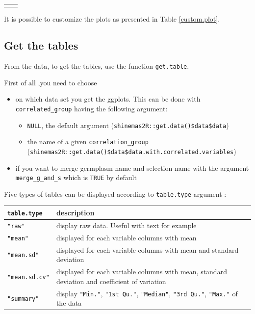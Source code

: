 \documentclass{article}\usepackage[]{graphicx}\usepackage[]{color}
\newenvironment{knitrout}{}{} %
\begin{document}
\begin{center}
\begin{tabular}{cc}
\begin{knitrout}
{}



\end{knitrout}
&
\\
\end{tabular}
\end{center}


It is possible to customize the plots as presented in Table \ref{custom.plot}.


\subsection{Get the tables}

From the data, to get the tables, use the function \texttt{get.table}.

First of all ,you need to choose

\begin{itemize}
\item on which data set you get the ggplots.
This can be done with \texttt{correlated\_group} having the following argument:
\begin{itemize}
\item \texttt{NULL}, the default argument (\texttt{shinemas2R::get.data()\$data\$data})
\item the name of a given \texttt{correlation\_group} (\texttt{shinemas2R::get.data()\$data\$data.with.correlated.variables})
\end{itemize}

\item if you want to merge germplasm name and selection name with the argument \texttt{merge\_g\_and\_s} which is \texttt{TRUE} by default
\end{itemize}


Five types of tables can be displayed according to \texttt{table.type} argument :

\begin{center}
\begin{tabular}{ll}
\hline
\texttt{table.type} & description \\
\hline

\texttt{"raw"} & display raw data. Useful with text for example \\
\hline

\texttt{"mean"} & displayed for each variable columns with mean \\
\hline

\texttt{"mean.sd"} & displayed for each variable columns with mean and standard deviation \\
\hline

\texttt{"mean.sd.cv"} & displayed for each variable columns with mean, standard deviation and coefficient of variation \\
\hline

\texttt{"summary"} & display \texttt{"Min."}, \texttt{"1st Qu."}, \texttt{"Median"}, \texttt{"3rd Qu."}, \texttt{"Max."} of the data \\
\hline
\end{tabular}
\end{center}
\end{document}
